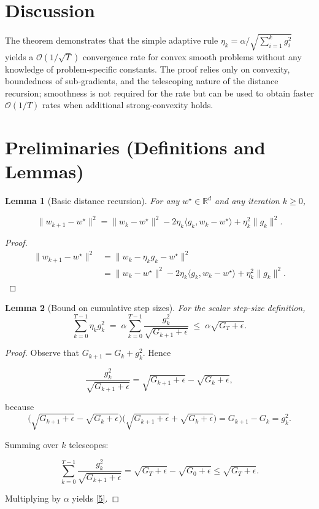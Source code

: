 \documentclass{article}
\newtheorem{lemma}{Lemma}
\newcommand{\R}{\mathbb{R}}
\begin{document}
\section*{Discussion}
The theorem demonstrates that the simple adaptive rule
\(\eta_{k}= \alpha / \sqrt{\sum_{i=1}^{k} g_{i}^{2}}\) yields a
\(\mathcal{O}(1/\sqrt{T})\) convergence rate for convex smooth problems without
any knowledge of problem‑specific constants.  The proof relies only on convexity,
boundedness of sub‑gradients, and the telescoping nature of the distance
recursion; smoothness is not required for the rate but can be used to obtain
faster \(\mathcal{O}(1/T)\) rates when additional strong‑convexity holds.

\newpage
\section*{Preliminaries (Definitions and Lemmas)}
\begin{lemma}[Basic distance recursion]\label{lem:recursion}
For any \(w^{\star}\in\R^{d}\) and any iteration \(k\ge0\),

\[
\|w_{k+1}-w^{\star}\|^{2}
=
\|w_{k}-w^{\star}\|^{2}
-2\eta_{k}\langle g_{k},w_{k}-w^{\star}\rangle
+\eta_{k}^{2}\|g_{k}\|^{2}.
\tag{4}
\]
\end{lemma}
\begin{proof}
\[
\begin{aligned}
\|w_{k+1}-w^{\star}\|^{2}
&=\|w_{k}-\eta_{k}g_{k}-w^{\star}\|^{2}\\
&=\|w_{k}-w^{\star}\|^{2}
-2\eta_{k}\langle g_{k},w_{k}-w^{\star}\rangle
+\eta_{k}^{2}\|g_{k}\|^{2}.
\end{aligned}
\]
\end{proof}

\begin{lemma}[Bound on cumulative step sizes]\label{lem:steps}
For the scalar step-size definition,
\[
\sum_{k=0}^{T-1}\eta_{k}g_{k}^{2}
\;=\;
\alpha\sum_{k=0}^{T-1}\frac{g_{k}^{2}}{\sqrt{G_{k+1}+\epsilon}}
\;\le\;
\alpha\sqrt{G_{T}+\epsilon}.
\tag{5}
\]
\end{lemma}
\begin{proof}
Observe that \(G_{k+1}=G_{k}+g_{k}^{2}\). Hence  

\[
\frac{g_{k}^{2}}{\sqrt{G_{k+1}+\epsilon}}
=
\sqrt{G_{k+1}+\epsilon}-\sqrt{G_{k}+\epsilon},
\]

because
\[
\bigl(\sqrt{G_{k+1}+\epsilon}-\sqrt{G_{k}+\epsilon}\bigr)
\bigl(\sqrt{G_{k+1}+\epsilon}+\sqrt{G_{k}+\epsilon}\bigr)
=G_{k+1}-G_{k}=g_{k}^{2}.
\]

Summing over \(k\) telescopes:

\[
\sum_{k=0}^{T-1}\frac{g_{k}^{2}}{\sqrt{G_{k+1}+\epsilon}}
=
\sqrt{G_{T}+\epsilon}-\sqrt{G_{0}+\epsilon}
\le \sqrt{G_{T}+\epsilon}.
\]

Multiplying by \(\alpha\) yields \eqref{5}.
\end{proof}
\end{document}
